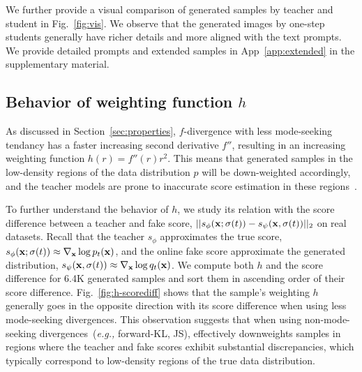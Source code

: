 We further provide a visual comparison of generated samples by teacher and student in Fig.~\ref{fig:vis}. We observe that the generated images by one-step students generally have richer details and more aligned with the text prompts. We provide detailed prompts and extended samples in App~\ref{app:extended} in the supplementary material. 







\subsection{Behavior of weighting function $h$}

As discussed in Section~\ref{sec:properties}, $f$-divergence with less mode-seeking tendancy has a faster increasing second derivative $f''$, resulting in an increasing weighting function $h(r)=f''(r)r^2$. This means that generated samples in the low-density regions of the data distribution $p$ will be down-weighted accordingly, and the teacher models are prone to inaccurate score estimation in these regions~\cite{karras2024guiding}.


To further understand the behavior of $h$, we study its relation with the score difference between a teacher and fake score, \ie $||s_\phi({\mathbf{x}}; \sigma(t)) - s_\psi({\mathbf{x}}, \sigma(t))||_2$ on real datasets. Recall that the teacher $s_\phi$ approximates the true score, \ie $s_\phi({\mathbf{x}}; \sigma(t)) \approx \nabla_{\mathbf{x}} \log p_t({\mathbf{x}})$, and the online fake score approximate the generated distribution, \ie $s_\psi ({\mathbf{x}}, \sigma(t)) \approx \nabla_{\mathbf{x}} \log q_t({\mathbf{x}})$. We compute both $h$ and the score difference for 6.4K generated samples and sort them in ascending order of their score difference. Fig.~\ref{fig:h-scorediff} shows that the sample's weighting $h$ generally goes in the opposite direction with its score difference when using less mode-seeking divergences. This observation suggests that when using non-mode-seeking divergences~(\textit{e.g.,} forward-KL, JS), \methodtext effectively downweights samples in regions where the teacher and fake scores exhibit substantial discrepancies, which typically correspond to low-density regions of the true data distribution.
